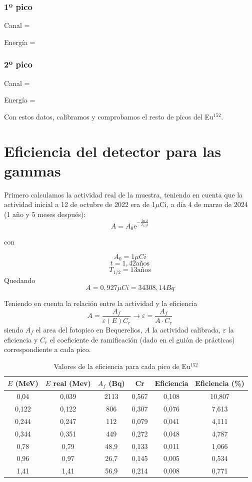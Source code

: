 \documentclass[a4paper,12pt,spanish]{article}
\begin{document}
	\subsubsection*{1º pico}
	Canal = 
	
	Energía = 
	
	\subsubsection*{2º pico}
	Canal = 
	
	Energía = 
	
	Con estos datos, calibramos y comprobamos el resto de picos del Eu$^{152}$. 
	
	
	
	\section{Eficiencia del detector para las gammas}
	
	Primero calculamos la actividad real de la muestra, teniendo en cuenta que la actividad inicial a 12 de octubre de 2022 era de 1$\mu$Ci, a día 4 de marzo de 2024 (1 año y 5
	meses después):
	\[ A = A_0 \text{e}^{-\frac{\ln2}{T_{1/2}t}}\]
		
	con 
	
	\[A_0 = 1\si{\mu Ci}\]
	\[t = 1,42 \text{años}\]
	\[ T_{1/2} = 13 \text{años}
	\]
	Quedando
	\[ A = 0,927\si{\mu Ci} = 34308,14 \si{Bq}
	\]
	
	Teniendo en cuenta la relación entre la actividad y la eficiencia
	\[ A = \frac{A_f}{\varepsilon(E) C_r} \longrightarrow \varepsilon = \frac{A_f}{A·C_r}
	\]
	siendo $A_f$ el area del fotopico en Bequerelios, $A$ la actividad calibrada, $\varepsilon$ la eficiencia y $C_r$ el coeficiente de ramificación (dado en el guión de prácticas) correspondiente a cada pico.
	
	\begin{table}[H]
		\centering
		\begin{tabular}{|c|c|c|c|c|c|}
			\hline
			$E$ (MeV) & $E$ real (Mev) & $A_f$ (Bq) & Cr    & Eficiencia & Eficiencia (\%) \\ \hline\hline
			0,04      & 0,039          & 2113       & 0,567 & 0,108      & 10,807          \\ \hline
			0,122     & 0,122          & 806        & 0,307 & 0,076      & 7,613           \\ \hline
			0,244     & 0,247          & 112        & 0,079 & 0,041      & 4,111           \\ \hline
			0,344     & 0,351          & 449        & 0,272 & 0,048      & 4,787           \\ \hline
			0,78      & 0,79           & 48,9       & 0,133 & 0,011      & 1,066           \\ \hline
			0,96      & 0,97           & 26,7       & 0,145 & 0,005      & 0,534           \\ \hline
			1,41      & 1,41           & 56,9       & 0,214 & 0,008      & 0,771           \\ \hline
		\end{tabular}
	\caption{Valores de la eficiencia para cada pico de Eu$^{152}$}
	\end{table}
	
\end{document}
